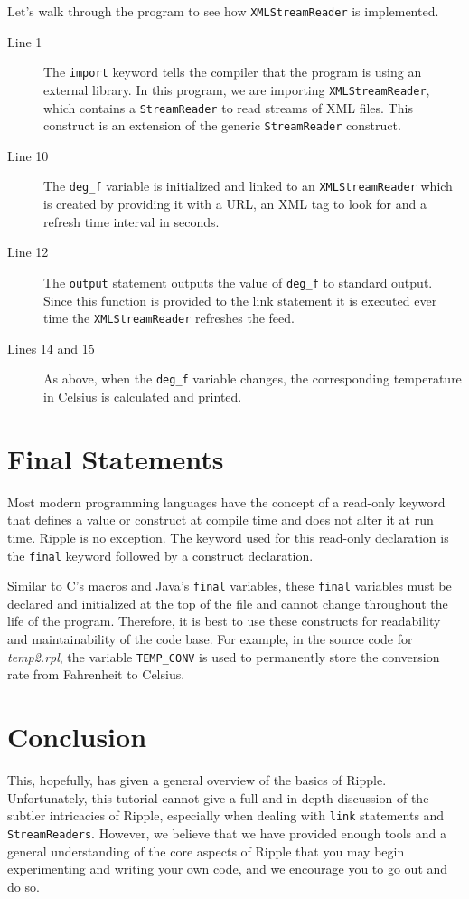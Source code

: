\documentclass{article}
\newcommand{\code}{\texttt}
\begin{document}
Let's walk through the program to see how \code{XMLStreamReader} is implemented.

\begin{description}
\item[Line 1] The \code{import} keyword tells the compiler that the program is using an external library. In this program, we are importing \code{XMLStreamReader}, which contains a \code{StreamReader} to read streams of XML files. This construct is an extension of the generic \code{StreamReader} construct.
\item[Line 10] The \code{deg\_f} variable is initialized and linked to an  \code{XMLStreamReader} which is created by providing it with a URL, an XML tag to look for and a refresh time interval in seconds.
\item[Line 12] The \code{output} statement outputs the value of \code{deg\_f} to standard output. Since this function is provided to the link statement it is executed ever time the \code{XMLStreamReader} refreshes the feed.
\item[Lines 14 and 15] As above, when the \code{deg\_f} variable changes, the corresponding temperature in Celsius is calculated and printed.
\end{description}

\section{Final Statements}
Most modern programming languages have the concept of a read-only keyword that defines a value or construct at compile time and does not alter it at run time. Ripple is no exception. The keyword used for this read-only declaration is the \code{final} keyword followed by a construct declaration. 

Similar to C's macros and Java's \code{final} variables, these \code{final} variables must be declared and initialized at the top of the file and cannot change throughout the life of the program. Therefore, it is best to use these constructs for readability and maintainability of the code base. For example, in the source code for \emph{temp2.rpl}, the variable \code{TEMP\_CONV} is used to permanently store the conversion rate from Fahrenheit to Celsius.

\section{Conclusion}
This, hopefully, has given a general overview of the basics of Ripple. Unfortunately, this tutorial cannot give a full and in-depth discussion of the subtler intricacies of Ripple, especially when dealing with \code{link} statements and \code{StreamReaders}. However, we believe that we have provided enough tools and a general understanding of the core aspects of Ripple that you may begin experimenting and writing your own code, and we encourage you to go out and do so.
\end{document}

